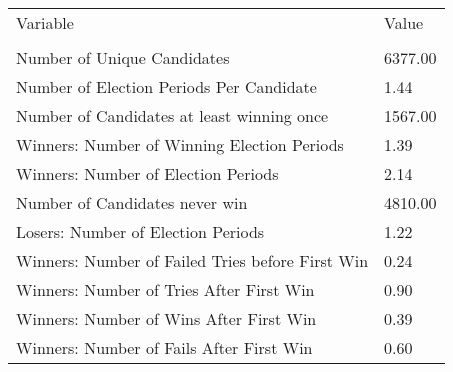 \begin{tabular}{l|l}
\toprule
                                         Variable &         Value \\
                                                  &               \\
\midrule
                      Number of Unique Candidates &       6377.00 \\
         Number of Election Periods Per Candidate &          1.44 \\
       Number of Candidates at least winning once &       1567.00 \\
      Winners: Number of Winning Election Periods &          1.39 \\
              Winners: Number of Election Periods &          2.14 \\
                   Number of Candidates never win &       4810.00 \\
               Losers: Number of Election Periods &          1.22 \\
 Winners: Number of Failed Tries before First Win &          0.24 \\
         Winners: Number of Tries After First Win &          0.90 \\
          Winners: Number of Wins After First Win &          0.39 \\
         Winners: Number of Fails After First Win &          0.60 \\
\bottomrule
\end{tabular}
